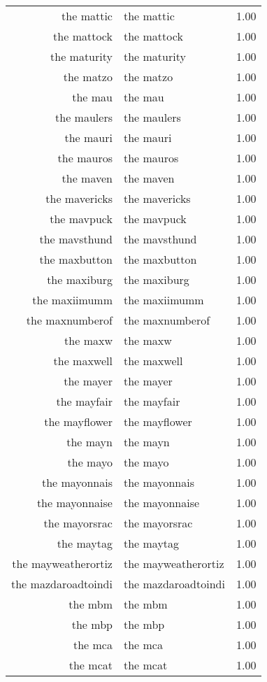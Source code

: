 \begin{table}[ht]
\begin{tabular}{rlr}
  the mattic & the mattic & 1.00 \\ 
  the mattock & the mattock & 1.00 \\ 
  the maturity & the maturity & 1.00 \\ 
  the matzo & the matzo & 1.00 \\ 
  the mau & the mau & 1.00 \\ 
  the maulers & the maulers & 1.00 \\ 
  the mauri & the mauri & 1.00 \\ 
  the mauros & the mauros & 1.00 \\ 
  the maven & the maven & 1.00 \\ 
  the mavericks & the mavericks & 1.00 \\ 
  the mavpuck & the mavpuck & 1.00 \\ 
  the mavsthund & the mavsthund & 1.00 \\ 
  the maxbutton & the maxbutton & 1.00 \\ 
  the maxiburg & the maxiburg & 1.00 \\ 
  the maxiimumm & the maxiimumm & 1.00 \\ 
  the maxnumberof & the maxnumberof & 1.00 \\ 
  the maxw & the maxw & 1.00 \\ 
  the maxwell & the maxwell & 1.00 \\ 
  the mayer & the mayer & 1.00 \\ 
  the mayfair & the mayfair & 1.00 \\ 
  the mayflower & the mayflower & 1.00 \\ 
  the mayn & the mayn & 1.00 \\ 
  the mayo & the mayo & 1.00 \\ 
  the mayonnais & the mayonnais & 1.00 \\ 
  the mayonnaise & the mayonnaise & 1.00 \\ 
  the mayorsrac & the mayorsrac & 1.00 \\ 
  the maytag & the maytag & 1.00 \\ 
  the mayweatherortiz & the mayweatherortiz & 1.00 \\ 
  the mazdaroadtoindi & the mazdaroadtoindi & 1.00 \\ 
  the mbm & the mbm & 1.00 \\ 
  the mbp & the mbp & 1.00 \\ 
  the mca & the mca & 1.00 \\ 
  the mcat & the mcat & 1.00 \\ 

\end{tabular}
\end{table}
